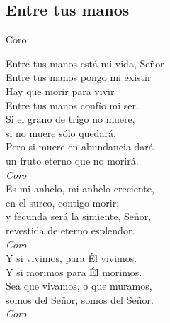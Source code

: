 \subsection{Entre tus manos}
\begin{center}
{\Large
\begin{flushleft} Coro: \end{flushleft}

Entre tus manos está mi vida, Señor\\
Entre tus manos pongo mi existir\\
Hay que morir para vivir\\
Entre tus manos confío mi ser.\\
\vspace{2em}
Si el grano de trigo no muere,\\
si no muere sólo quedará.\\
Pero si muere en abundancia dará\\
un fruto eterno que no morirá.\\
\vspace{1ex}
\textit{Coro}\\
\vspace{1ex}
Es mi anhelo, mi anhelo creciente,\\
en el surco, contigo morir;\\
y fecunda será la simiente, Señor,\\
revestida de eterno esplendor.\\
\vspace{1ex}
\textit{Coro}\\
\vspace{1ex}
Y si vivimos, para Él vivimos.\\
Y si morimos para Él morimos.\\
Sea que vivamos, o que muramos,\\
somos del Señor, somos del Señor.\\
\vspace{1ex}
\textit{Coro}\\
\vspace{1ex}
}
\end{center}